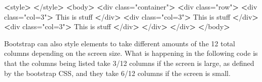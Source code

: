 \documentclass[]{book}
\newenvironment{Shaded}{\begin{snugshade}}{\end{snugshade}}
\newcommand{\ExtensionTok}[1]{#1}
\newcommand{\NormalTok}[1]{#1}
\newcommand{\OperatorTok}[1]{\textcolor[rgb]{0.81,0.36,0.00}{\textbf{#1}}}
\newcommand{\StringTok}[1]{\textcolor[rgb]{0.31,0.60,0.02}{#1}}
\begin{document}
\begin{Shaded}
\begin{Highlighting}[]
\OperatorTok{<}\ExtensionTok{style}\OperatorTok{>}
\OperatorTok{<}\NormalTok{/}\ExtensionTok{style}\OperatorTok{>}
\OperatorTok{<}\ExtensionTok{body}\OperatorTok{>}
    \OperatorTok{<}\ExtensionTok{div}\NormalTok{ class=}\StringTok{"container"}\OperatorTok{>}
        \OperatorTok{<}\ExtensionTok{div}\NormalTok{ class=}\StringTok{"row"}\OperatorTok{>}
            \OperatorTok{<}\ExtensionTok{div}\NormalTok{ class=}\StringTok{"col=3"}\OperatorTok{>}
                \ExtensionTok{This}\NormalTok{ is stuff}
            \OperatorTok{<}\NormalTok{/}\ExtensionTok{div}\OperatorTok{>}
            \OperatorTok{<}\ExtensionTok{div}\NormalTok{ class=}\StringTok{"col=3"}\OperatorTok{>}
                \ExtensionTok{This}\NormalTok{ is stuff}
            \OperatorTok{<}\NormalTok{/}\ExtensionTok{div}\OperatorTok{>}
            \OperatorTok{<}\ExtensionTok{div}\NormalTok{ class=}\StringTok{"col=3"}\OperatorTok{>}
                \ExtensionTok{This}\NormalTok{ is stuff}
            \OperatorTok{<}\NormalTok{/}\ExtensionTok{div}\OperatorTok{>}
        \OperatorTok{<}\NormalTok{/}\ExtensionTok{div}\OperatorTok{>}
    \OperatorTok{<}\NormalTok{/}\ExtensionTok{div}\OperatorTok{>}
\OperatorTok{<}\NormalTok{/}\ExtensionTok{body}\OperatorTok{>}
\end{Highlighting}
\end{Shaded}

Bootstrap can also style elements to take different amounts of the 12 total columns depending on the screen size. What is happening in the following code is that the columns being listed take 3/12 columns if the screen is large, as defined by the bootstrap CSS, and they take 6/12 columns if the screen is small.
\end{document}
